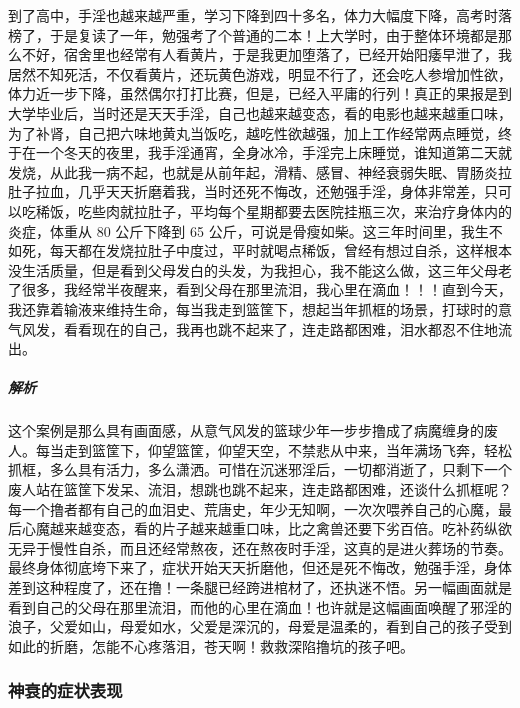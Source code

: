 \begin{case}[神经衰弱]
    到了高中，手淫也越来越严重，学习下降到四十多名，体力大幅度下降，高考时落榜了，于是复读了一年，勉强考了个普通的二本！上大学时，由于整体环境都是那么不好，宿舍里也经常有人看黄片，于是我更加堕落了，已经开始阳痿早泄了，我居然不知死活，不仅看黄片，还玩黄色游戏，明显不行了，还会吃人参增加性欲，体力近一步下降，虽然偶尔打打比赛，但是，已经入平庸的行列！真正的果报是到大学毕业后，当时还是天天手淫，自己也越来越变态，看的电影也越来越重口味，为了补肾，自己把六味地黄丸当饭吃，越吃性欲越强，加上工作经常两点睡觉，终于在一个冬天的夜里，我手淫通宵，全身冰冷，手淫完上床睡觉，谁知道第二天就发烧，从此我一病不起，也就是从前年起，滑精、感冒、神经衰弱失眠、胃肠炎拉肚子拉血，几乎天天折磨着我，当时还死不悔改，还勉强手淫，身体非常差，只可以吃稀饭，吃些肉就拉肚子，平均每个星期都要去医院挂瓶三次，来治疗身体内的炎症，体重从 80 公斤下降到 65 公斤，可说是骨瘦如柴。这三年时间里，我生不如死，每天都在发烧拉肚子中度过，平时就喝点稀饭，曾经有想过自杀，这样根本没生活质量，但是看到父母发白的头发，为我担心，我不能这么做，这三年父母老了很多，我经常半夜醒来，看到父母在那里流泪，我心里在滴血！！！直到今天，我还靠着输液来维持生命，每当我走到篮筐下，想起当年抓框的场景，打球时的意气风发，看看现在的自己，我再也跳不起来了，连走路都困难，泪水都忍不住地流出。
    \subparagraph{解析} 这个案例是那么具有画面感，从意气风发的篮球少年一步步撸成了病魔缠身的废人。每当走到篮筐下，仰望篮筐，仰望天空，不禁悲从中来，当年满场飞奔，轻松抓框，多么具有活力，多么潇洒。可惜在沉迷邪淫后，一切都消逝了，只剩下一个废人站在篮筐下发呆、流泪，想跳也跳不起来，连走路都困难，还谈什么抓框呢？每一个撸者都有自己的血泪史、荒唐史，年少无知啊，一次次喂养自己的心魔，最后心魔越来越变态，看的片子越来越重口味，比之禽兽还要下劣百倍。吃补药纵欲无异于慢性自杀，而且还经常熬夜，还在熬夜时手淫，这真的是进火葬场的节奏。最终身体彻底垮下来了，症状开始天天折磨他，但还是死不悔改，勉强手淫，身体差到这种程度了，还在撸！一条腿已经跨进棺材了，还执迷不悟。另一幅画面就是看到自己的父母在那里流泪，而他的心里在滴血！也许就是这幅画面唤醒了邪淫的浪子，父爱如山，母爱如水，父爱是深沉的，母爱是温柔的，看到自己的孩子受到如此的折磨，怎能不心疼落泪，苍天啊！救救深陷撸坑的孩子吧。
\end{case}

\subsubsection{神衰的症状表现}

